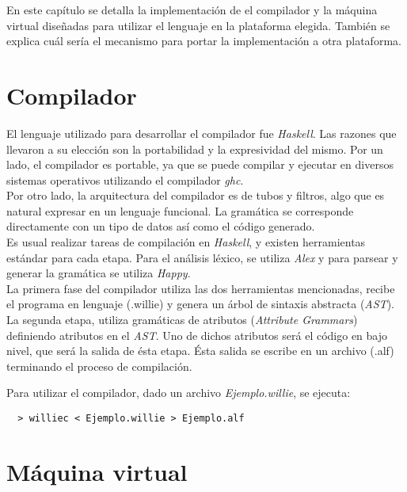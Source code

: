 
En este capítulo se detalla la implementación de el compilador
y la máquina virtual diseñadas para utilizar el lenguaje
\frob en la plataforma elegida.
También se explica cuál sería el mecanismo para portar la
implementación a otra plataforma.


\section{Compilador}

  El lenguaje utilizado para desarrollar el compilador fue \textit{Haskell}.
Las razones que llevaron a su elección son la portabilidad y la expresividad
del mismo.
Por un lado, el compilador es portable, ya que se puede compilar y ejecutar
en diversos sistemas operativos utilizando el compilador \textit{ghc}.\\

  Por otro lado, la arquitectura del compilador es de tubos y filtros, algo
  que es natural expresar en un lenguaje funcional.
  La gramática se corresponde directamente con un tipo de datos así
  como el código generado.\\

  Es usual realizar tareas de compilación en \textit{Haskell}, y existen
herramientas estándar para cada etapa.
  Para el análisis léxico, se utiliza \textit{Alex} \cite{alex} y
  para parsear y generar
  la gramática se utiliza \textit{Happy}. \cite{happy} \\

  La primera fase del compilador utiliza las dos herramientas mencionadas,
recibe el programa en lenguaje \frob (.willie) y genera un árbol de
sintaxis abstracta (\emph{AST}).\\

  La segunda etapa, utiliza gramáticas de atributos (\emph{Attribute Grammars})
definiendo atributos en el \emph{AST}.
  Uno de dichos atributos será el código en bajo nivel, que será la salida
de ésta etapa.
  Ésta salida se escribe en un archivo (.alf) terminando el proceso
  de compilación.

  Para utilizar el compilador, dado un archivo \textit{Ejemplo.willie}, se
  ejecuta:

  \begin{verbatim}
  > williec < Ejemplo.willie > Ejemplo.alf
  \end{verbatim}

\section{Máquina virtual}

